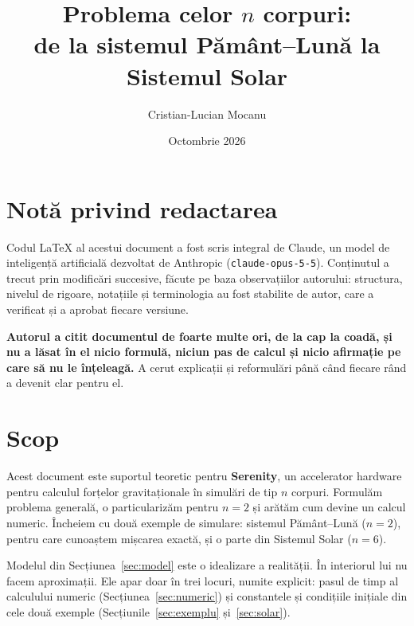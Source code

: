 \documentclass[11pt,a4paper]{article}
\title{Problema celor $n$ corpuri:\\ de la sistemul Pământ--Lună la Sistemul Solar}
\author{Cristian-Lucian Mocanu}
\date{Octombrie 2026}
\begin{document}
\maketitle

\section*{Notă privind redactarea}
Codul \LaTeX{} al acestui document a fost scris integral de Claude, un model de inteligență artificială dezvoltat de Anthropic (\texttt{claude-opus-5-5}). Conținutul a trecut prin modificări succesive, făcute pe baza observațiilor autorului: structura, nivelul de rigoare, notațiile și terminologia au fost stabilite de autor, care a verificat și a aprobat fiecare versiune.

\textbf{Autorul a citit documentul de foarte multe ori, de la cap la coadă, și nu a lăsat în el nicio formulă, niciun pas de calcul și nicio afirmație pe care să nu le înțeleagă.} A cerut explicații și reformulări până când fiecare rând a devenit clar pentru el.

\section*{Scop}
Acest document este suportul teoretic pentru \textbf{Serenity}, un accelerator hardware pentru calculul forțelor gravitaționale în simulări de tip $n$ corpuri. Formulăm problema generală, o particularizăm pentru $n = 2$ și arătăm cum devine un calcul numeric. Încheiem cu două exemple de simulare: sistemul Pământ--Lună ($n = 2$), pentru care cunoaștem mișcarea exactă, și o parte din Sistemul Solar ($n = 6$).

Modelul din Secțiunea~\ref{sec:model} este o idealizare a realității. În interiorul lui nu facem aproximații. Ele apar doar în trei locuri, numite explicit: pasul de timp al calculului numeric (Secțiunea~\ref{sec:numeric}) și constantele și condițiile inițiale din cele două exemple (Secțiunile~\ref{sec:exemplu} și~\ref{sec:solar}).
\end{document}
